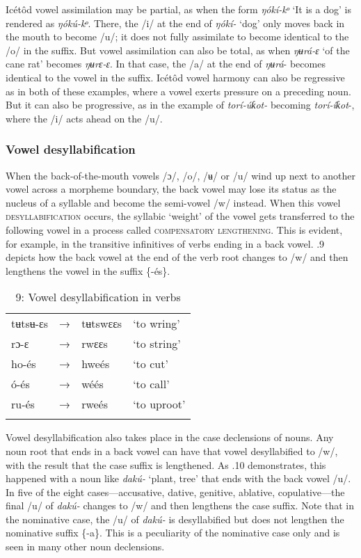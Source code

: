 Icétôd vowel assimilation may be partial, as when the form \textit{ŋókí-kᵒ} ‘It is a dog’ is rendered as \textit{ŋókú-kᵒ}. There, the /i/ at the end of \textit{ŋókí-} ‘dog’ only moves back in the mouth to become /u/; it does not fully assimilate to become identical to the /o/ in the suffix. But vowel assimilation can also be total, as when \textit{ŋʉrá-ɛ} ‘of the cane rat’ becomes \textit{ŋʉrɛ-ɛ}. In that case, the /a/ at the end of \textit{ŋʉrá}{}- becomes identical to the vowel in the suffix. Icétôd vowel harmony can also be regressive as in both of these examples, where a vowel exerts pressure on a preceding noun. But it can also be progressive, as in the example of \textit{torí-úƙot-} becoming \textit{torí-íƙot}{}-, where the /i/ acts ahead on the /u/.
 
\subsubsection{Vowel desyllabification}

When the back-of-the-mouth vowels /ɔ/, /o/, /ʉ/ or /u/ wind up next to another vowel across a morpheme boundary, the back vowel may lose its status as the nucleus of a syllable and become the semi-vowel /w/ instead. When this vowel \textsc{desyllabification} occurs, the syllabic ‘weight’ of the vowel gets transferred to the following vowel in a process called \textsc{compensatory lengthening}. This is evident, for example, in the transitive infinitives of verbs ending in a back vowel. .9 depicts how the back vowel at the end of the verb root changes to /w/ and then lengthens the vowel in the suffix \{-és\}.


\begin{table}
\caption{9: Vowel desyllabification in verbs}
\label{tab:2}


\begin{tabularx}{\textwidth}{XXXX}
\lsptoprule

tʉtsʉ-ɛs & → & tʉtswɛɛs & ‘to wring’\\
rɔ-ɛ & → & rwɛɛs & ‘to string’\\
ho-és & → & hweés & ‘to cut’\\
ó-és & → & wéés & ‘to call’\\
ru-és & → & rweés & ‘to uproot’\\
\lspbottomrule
\end{tabularx}
\end{table}

Vowel desyllabification also takes place in the case declensions of nouns. Any noun root that ends in a back vowel can have that vowel desyllabified to /w/, with the result that the case suffix is lengthened. As .10 demonstrates, this happened with a noun like \textit{dakú-} ‘plant, tree’ that ends with the back vowel /u/. In five of the eight cases—accusative, dative, genitive, ablative, copulative—the final /u/ of \textit{dakú-} changes to /w/ and then lengthens the case suffix. Note that in the nominative case, the /u/ of \textit{dakú-} is desyllabified but does not lengthen the nominative suffix \{-a\}. This is a peculiarity of the nominative case only and is seen in many other noun declensions.


